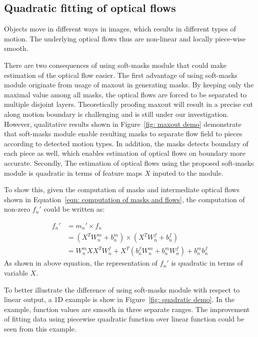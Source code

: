 \documentclass[10pt,twocolumn,letterpaper]{article}
\begin{document}
\subsection{Quadratic fitting of optical flows}
Objects move in different ways in images, which results in different types of motion. The underlying optical flows thus are non-linear and locally piece-wise smooth. 

There are two consequences of using soft-masks module that could make estimation of the optical flow easier. The first advantage of using soft-masks module originate from usage of maxout in generating masks. By keeping only the maximal value among all masks, the optical flows are forced to be separated to multiple disjoint layers. Theoretically proofing maxout will result in a precise cut along motion boundary is challenging and is still under our investigation. However, qualitative results shown in Figure~\ref{fig: maxout demo} demonstrate that soft-masks module enable resulting masks to separate flow field to pieces according to detected motion types. In addition, the masks detects boundary of each piece as well, which enables estimation of optical flows on boundary more accurate.  Secondly, The estimation of optical flows using the proposed soft-masks module is quadratic in terms of feature maps $X$ inputed to the module.

To show this, given the computation of masks and intermediate optical flows shown in Equation~\ref{eqn: computation of masks and flows}, the computation of non-zero $f_n'$ could be written as:

\begin{align}
f_n' & = m_n' \times f_n \nonumber\\
	 & = (X^T W_n^m + b_n^m) \times (X^T W_n^f + b_n^f) \nonumber\\
	 & = W_n^m X X^T W_n^f + X^T(b_n^f W_n^m + b_n^m W_n^f) + b_n^m b_n^f
\end{align}
As shown in above equation, the representation of $f_n'$ is quadratic in terms of variable $X$.

To better illustrate the difference of using soft-masks module with respect to linear output, a 1D example is show in Figure~\ref{fig: quadratic demo}. In the example, function values are smooth in three separate ranges. The improvement of fitting data using piecewise quadratic function over linear function could be seen from this example. 
\end{document}
